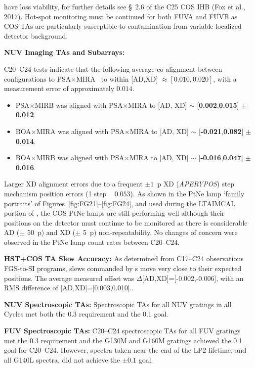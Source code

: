 \begin{description}
{	have loss viability, for further details see \S~2.6 of the C25 COS IHB (Fox et al., 2017).
	Hot-spot monitoring must be continued for both FUVA and FUVB as COS TAs are particularly susceptible to contamination from variable localized detector background.
}
\item{\bf NUV Imaging TAs and Subarrays:}{
	C20--C24  tests indicate that the following average co-alignment between  configurations to PSA$\times$MIRA ~to within [AD,XD] $\approx [0.010,0.020]$\arcsec{}, with a measurement error of approximately $0.014$\arcsec{}.
	\begin{itemize}
	\item PSA$\times$MIRB was aligned with PSA$\times$MIRA to [AD, XD] $\sim$ [{\bf 0.002},{\bf 0.015}] $\pm$ {\bf 0.012}\arcsec.
	\item BOA$\times$MIRA was aligned with PSA$\times$MIRA to [AD, XD] $\sim$ [{\bf-0.021},{\bf 0.082}] $\pm$ {\bf 0.014}\arcsec.
	\item BOA$\times$MIRB was aligned with PSA$\times$MIRA to [AD, XD] $\sim$ [{\bf-0.016},{\bf 0.047}] $\pm$ {\bf 0.016}\arcsec.
	\end{itemize}
	Larger XD alignment errors due to a frequent $\pm 1$~p XD (\textit{APERYPOS}) step mechanism position errors (1 step ~ $0.053$\arcsec{}).
	As shown in the PtNe lamp `family portraits' of Figures~\ref{fig:FG21}--\ref{fig:FG24}, and used during the \textsc{LTAIMCAL} portion of ,
	the COS PtNe lamps are still performing well although their positions on the detector must continue to be monitored as there is
	considerable AD ($\pm$ 50~p) and XD ($\pm$ 5~p) non-repeatability.
	No changes of concern were observed in the PtNe lamp count rates between C20--C24.
}
\item{\bf HST+COS TA Slew Accuracy:}{
	As determined from C17--C24 observations FGS-to-SI programs, slews commanded by s move very close to their expected positions.
	The average measured offset was $\Delta$[AD,XD]=[-0.002,-0.006]\arcsec{}, with an RMS difference of [AD,XD]=[0.003,0.010]\arcsec{}..
}
\item{\bf NUV Spectroscopic TAs:}{
	Spectroscopic TAs for all NUV gratings in all Cycles met both the 0.3\arcsec{} requirement and the 0.1\arcsec{} goal.
}
\item{\bf FUV Spectroscopic TAs:}{
	C20--C24 spectroscopic TAs for all FUV gratings met the $0.3$\arcsec{} requirement and the G130M and G160M gratings achieved the 0.1\arcsec{} goal for C20--C24.
	However, spectra taken near the end of the LP2 lifetime, and all G140L spectra, did not achieve the $\pm 0.1$\arcsec{} goal.
}
\end{description}

